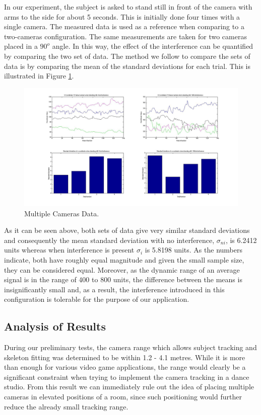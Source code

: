 \documentclass[11pt,a4paper]{article}
\begin{document}
\noindent
In our experiment, the subject is asked to stand still in front of the camera with arms to the side for about 5 seconds. This is initially done four times with a single camera. The measured data is used as a reference when comparing to a two-cameras configuration. The same measurements are taken for two cameras placed in a $90^o$ angle. In this way, the effect of the interference can be quantified by comparing the two set of data. The method we follow to compare the sets of data is by comparing the mean of the standard deviations for each trial. This is illustrated in Figure \ref{Multiple_Std}. 
 
\begin{figure}[H]
\centering
\includegraphics[scale=0.3]{Multiple_Cameras_Std.jpg}
\caption{Multiple Cameras Data.} %
\label{Multiple_Std}
\end{figure}

\noindent
As it can be seen above, both sets of data give very similar standard deviations and consequently the mean standard deviation with no interference, $\sigma_{ni}$, is 6.2412 units whereas when interference is present $\sigma_{i}$ is 5.8198 units. As the numbers indicate, both have roughly equal magnitude and given the small sample size, they can be considered equal. Moreover, as the dynamic range of an average signal is in the range of 400 to 800 units, the difference between the means is insignificantly small and, as a result, the interference introduced in this configuration is tolerable for the purpose of our application.

\subsection{Analysis of Results}
\noindent
During our preliminary tests, the camera range which allows subject tracking and skeleton fitting was determined to be within 1.2 - 4.1 metres. While it is more than enough for various video game applications, the range would clearly be a significant constraint when trying to implement the camera tracking in a dance studio. From this result we can immediately rule out the idea of placing multiple cameras in elevated positions of a room, since such positioning would further reduce the already small tracking range.
\end{document}
